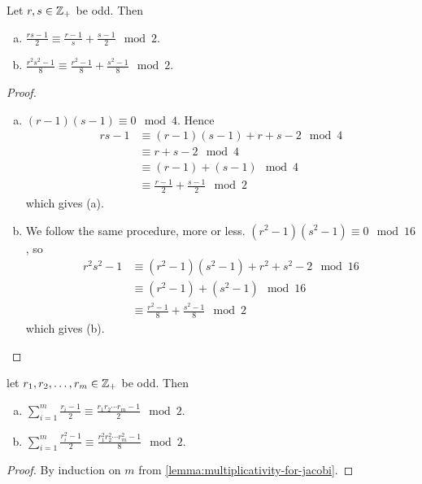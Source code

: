 \begin{lemma}\label{lemma:multiplicativity-for-jacobi}
    Let $r, s\in\mathbb Z_+$ be odd. Then
    \begin{enumerate}[(a)]
        \item $\displaystyle\frac{rs-1}{2}\equiv \frac{r-1}{s} + \frac{s-1}{2}\mod 2$.
        \item $\displaystyle\frac{r^2s^2 - 1}{8} \equiv \frac{r^2-1}{8} + \frac{s^2 - 1}{8}\mod 2$.
    \end{enumerate}
\end{lemma}
\begin{proof}
    ~\begin{enumerate}[(a)]
        \item $(r-1)(s-1)\equiv 0\mod 4$. Hence
              \begin{align*}
                  rs - 1 & \equiv (r-1)(s-1) + r + s - 2\mod 4          \\
                         & \equiv r + s - 2\mod{4}                      \\
                         & \equiv (r-1) + (s-1)\mod{4}                  \\
                         & \equiv \frac{r-1}{2} + \frac{s-1}{2} \mod{2}
              \end{align*}
              which gives (a).
        \item We follow the same procedure, more or less. $(r^2-1)(s^2-1)\equiv 0\mod{16}$, so
              \begin{align*}
                  r^2s^2-1 & \equiv (r^2-1)(s^2-1)+r^2+s^2-2\mod{16}         \\
                           & \equiv (r^2-1)+(s^2-1)\mod{16}                  \\
                           & \equiv \frac{r^2-1}{8} + \frac{s^2-1}{8}\mod{2}
              \end{align*}
              which gives (b).
    \end{enumerate}
\end{proof}

\begin{corollary}
    let $r_1, r_2, \dots, r_m\in\mathbb Z_+$ be odd. Then
    \begin{enumerate}[(a)]
        \item $\displaystyle
                  \sum_{i=1}^m \frac{r_i-1}{2} \equiv \frac{r_1r_2\cdots r_m - 1}{2}\mod 2
              $.
        \item $\displaystyle
                  \sum_{i=1}^m \frac{r_i^2 - 1}{2}\equiv \frac{r_1^2r_2^2\cdots r_m^2 - 1}{8}\mod 2
              $.
    \end{enumerate}
\end{corollary}
\begin{proof}
    By induction on $m$ from \cref{lemma:multiplicativity-for-jacobi}.
\end{proof}

